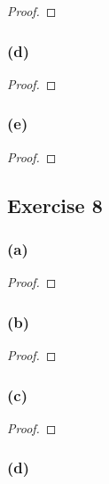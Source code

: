 \documentclass[14pt]{extarticle}
\begin{document}
\begin{proof}

\end{proof}

\subsubsection{(d)}

\begin{proof}

\end{proof}

\subsubsection{(e)}

\begin{proof}

\end{proof}

\subsection{Exercise 8}

\subsubsection{(a)}

\begin{proof}

\end{proof}

\subsubsection{(b)}

\begin{proof}

\end{proof}

\subsubsection{(c)}

\begin{proof}

\end{proof}

\subsubsection{(d)}
\end{document}
